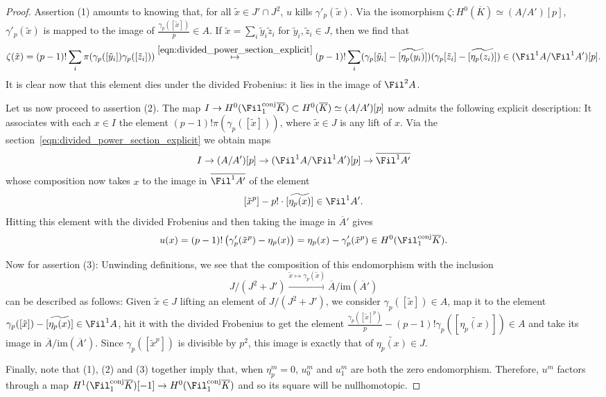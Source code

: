 \documentclass[10pt]{amsart}
\begin{document}
\begin{proof}
Assertion (1) amounts to knowing that, for all $\tilde{x}\in J'\cap J^2$, $u$ kills $\gamma'_p(\tilde{x})$. Via the isomorphism $\zeta:H^0(\overline{K}) \simeq (A/A')[p]$, $\gamma'_p(\tilde{x})$ is mapped to the image of $\frac{\gamma_p([\tilde{x}])}{p}\in A$. If $\tilde{x} = \sum_i\tilde{y}_i\tilde{z}_i$ for $\tilde{y}_i,\tilde{z}_i\in J$, then we find that
\[
\zeta(\tilde{x}) = (p-1)!\sum_{i}\pi(\gamma_p([\tilde{y}_i])\gamma_p([\tilde{z}_i]))\overset{\eqref{eqn:divided_power_section_explicit}}{\mapsto}(p-1)!\sum_i(\gamma_p[\tilde{y}_i]-[\widetilde{\eta_p(y_i)}])(\gamma_p[\tilde{z}_i]-[\widetilde{\eta_p(z_i)}])\in (\Fil^1A/\Fil^1A')[p].
\]
It is clear now that this element dies under the divided Frobenius: it lies in the image of $\Fil^2A$.

Let us now proceed to assertion (2). The map $I\to H^0(\Fil^{\mathrm{conj}}_1\overline{K})\subset H^0(\overline{K}) \simeq (A/A')[p]$ now admits the following explicit description: It associates with each $x\in I$ the element $(p-1)!\pi(\gamma_p([\tilde{x}]))$, where $\tilde{x}\in J$ is any lift of $x$. Via the section~\eqref{eqn:divided_power_section_explicit} we obtain maps
\[
I\to (A/A')[p]\to (\Fil^1A/\Fil^1A')[p]\to \overline{\Fil^1A'}
\]
whose composition now takes $x$ to the image in $\overline{\Fil^1A'}$ of the element
\[
[\tilde{x}^p] - p!\cdot[\widetilde{\eta_p(x)}]\in \Fil^1A'.
\]
Hitting this element with the divided Frobenius and then taking the image in $\overline{A}'$ gives
\[
u(x) = (p-1)!\left(\gamma'_p(\tilde{x}^p) - \eta_p(x)\right) = \eta_p(x) - \gamma'_p(\tilde{x}^p)\in  H^0(\Fil^{\mathrm{conj}}_1\overline{K}).
\]

Now for assertion (3): Unwinding definitions, we see that the composition of this endomorphism with the inclusion
\[
J/(J^2+J')\xrightarrow{\tilde{x} \mapsto \gamma_p(\tilde{x})}\overline{A}/\mathrm{im}(\overline{A}')
\]
can be described as follows: Given $\tilde{x}\in J$ lifting an element of $J/(J^2+J')$, we consider $\gamma_p([\tilde{x}])\in A$, map it to the element $\gamma_p([\tilde{x}]) - [\widetilde{\eta_p(x)}]\in \Fil^1A$, hit it with the divided Frobenius to get the element $\frac{\gamma_p([\tilde{x}]^p)}{p} - (p-1)!\gamma_p([\widetilde{\eta_p(x)}])\in A$ and take its image in $\overline{A}/\mathrm{im}(\overline{A}')$. Since $\gamma_p([\tilde{x}^p])$ is divisible by $p^2$, this image is exactly that of $\widetilde{\eta_p(x)}\in J$.

Finally, note that (1), (2) and (3) together imply that, when $\eta_p^m = 0$, $u_0^m$ and $u_1^m$ are both the zero endomorphism. Therefore, $u^m$ factors through a map $H^1(\Fil^{\mathrm{conj}}_1\overline{K})[-1]\to H^0(\Fil^{\mathrm{conj}}_1\overline{K})$ and so its square will be nullhomotopic.
\end{proof}
\end{document}
